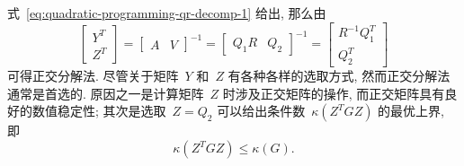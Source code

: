 \documentclass{SBCbookchapter}
\numberwithin{equation}{section}
\begin{document}
式~\eqref{eq:quadratic-programming-qr-decomp-1} 给出, 那么由
\begin{equation*}
\begin{bmatrix} Y^T \\ Z^T \end{bmatrix} = \begin{bmatrix} A & V \end{bmatrix}^{-1} = \begin{bmatrix} Q_1R & Q_2 \end{bmatrix}^{-1} = \begin{bmatrix} R^{-1} Q_1^T \\ Q_2^T \end{bmatrix}
\end{equation*}
可得正交分解法. 尽管关于矩阵~$Y$ 和~$Z$ 有各种各样的选取方式, 然而正交分解法通常是首选的. 原因之一是计算矩阵~$Z$ 时涉及正交矩阵的操作, 而正交矩阵具有良好的数值稳定性; 其次是选取~$Z = Q_2$ 可以给出条件数~$\kappa(Z^T G Z)$ 的最优上界, 即
\begin{equation*}
\kappa(Z^T G Z) \leqslant \kappa(G).
\end{equation*}
\end{document}
